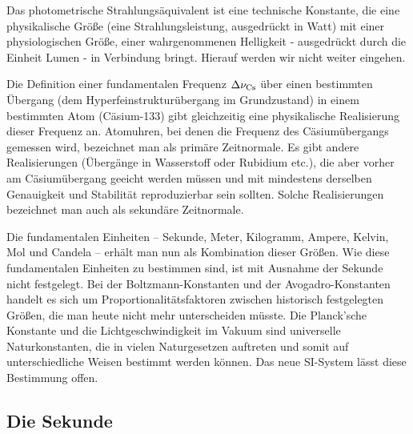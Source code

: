 Das photometrische Strahlungs\"aquivalent ist eine technische Konstante, die eine physikalische
Gr\"o\ss e (eine Strahlungsleistung, ausgedr\"uckt in Watt) mit einer physiologischen Gr\"o\ss e,
einer wahrgenommenen Helligkeit - ausgedr\"uckt durch die Einheit Lumen - in Verbindung bringt. 
Hierauf werden wir nicht weiter eingehen. 

Die Definition einer fundamentalen Frequenz $\Delta \nu_{\rm Cs}$ \"uber einen bestimmten
\"Ubergang (dem Hyperfeinstruktur\"ubergang im Grundzustand)
 in einem bestimmten Atom (C\"asium-133) gibt gleichzeitig eine physikalische Realisierung
dieser Frequenz an. Atomuhren, bei denen die Frequenz des C\"asium\"ubergangs gemessen wird, 
bezeichnet man als \glqq prim\"are Zeitnormale\grqq. 
Es gibt andere Realisierungen (\"Uberg\"ange in Wasserstoff oder Rubidium etc.),
die aber vorher am C\"asium\"ubergang geeicht werden m\"ussen und mit mindestens derselben
Genauigkeit und Stabilit\"at reproduzierbar sein sollten. Solche Realisierungen bezeichnet man
auch als \glqq sekund\"are Zeitnormale\grqq. 

Die fundamentalen Einheiten -- Sekunde, Meter, Kilogramm, Ampere, Kelvin, Mol und Candela --
erh\"alt man nun als Kombination dieser Gr\"o\ss en. Wie diese fundamentalen Einheiten zu bestimmen
sind, ist mit Ausnahme der Sekunde nicht festgelegt. Bei der Boltzmann-Konstanten und der Avogadro-Konstanten
handelt es sich um Proportionalit\"atsfaktoren zwischen historisch festgelegten Gr\"o\ss en, die
man heute nicht mehr unterscheiden m\"usste. Die Planck'sche Konstante und die Lichtgeschwindigkeit
im Vakuum sind universelle Naturkonstanten, die in vielen Naturgesetzen auftreten und somit
auf unterschiedliche Weisen bestimmt werden k\"onnen. Das neue SI-System l\"asst diese
Bestimmung offen.  

\subsection{Die Sekunde}
\label{sec_Sekunde}

